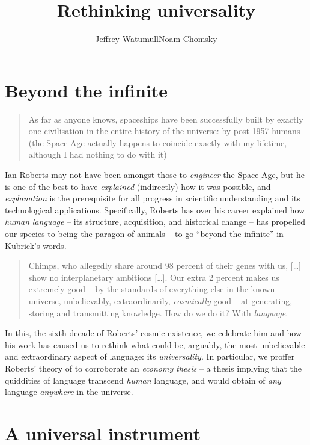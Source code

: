 \documentclass[output=paper]{langsci/langscibook}
\author{Jeffrey Watumull\affiliation{Oceanit}\lastand Noam Chomsky\affiliation{University of Arizona, Massachusetts Institute of Technology}}
\title{Rethinking universality}
\begin{document}
\glsresetall

\section{Beyond the infinite}%

\begin{quote}
As far as anyone knows, spaceships have been successfully built by exactly one
civilisation in the entire history of the universe: by post-1957 humans (the
Space Age actually happens to coincide exactly with my lifetime, although I had
nothing to do with it) \hfill \hbox{\citep[1]{Roberts2017}}
\end{quote}

Ian Roberts may not have been amongst those to \emph{engineer} the Space Age, but he is one of the best to
have \emph{explained} (indirectly) how it was possible, and \emph{explanation}
is the prerequisite for all progress in scientific understanding and its
technological applications. Specifically, Roberts has over his career explained
how \emph{human} \emph{language} -- its structure, acquisition, and historical
change -- has propelled our species to being the paragon of animals -- to go
\enquote{beyond the infinite} in Kubrick's words. \blockquote{Chimps, who
    allegedly share around 98 percent of their genes with us, […] show no
    interplanetary ambitions […]. Our extra 2 percent makes us extremely good -- by
    the standards of everything else in the known universe, unbelievably,
    extraordinarily, \emph{cosmically} good -- at generating, storing and
    transmitting knowledge. How do we do it? With \emph{language}.\\\hbox{}\hfill{\citep[1--2]{Roberts2017}}}
In this, the sixth decade of Roberts’ cosmic
existence, we celebrate him and how his work has caused us to rethink what
could be, arguably, the most unbelievable and extraordinary aspect of language:
its \emph{universality}. In particular, we proffer Roberts’ theory of
 to corroborate an \emph{economy thesis} -- a thesis
    implying that the quiddities of language transcend \emph{human} language,
    and would obtain of \emph{any} language \emph{anywhere} in the universe.

\section{A universal instrument}
\end{document}
